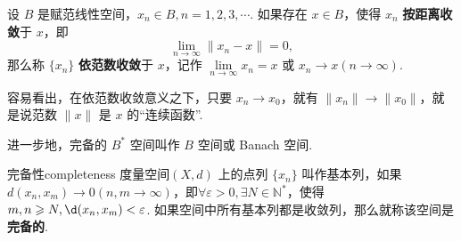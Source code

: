 \documentclass[12pt, a4paper,newtx]{ctexart}
\begin{document}
设 $B$ 是赋范线性空间，$x_n \in B, n = 1, 2, 3, \cdots$. 如果存在 $x \in B$，使得 $x_n$ \textbf{按距离收敛}于 $x$，即
\[
\lim_{n \to \infty} \|x_n - x\| = 0,
\]
那么称 $\{x_n\}$ \textbf{依范数收敛}于 $x$，记作 $\lim\limits_{n \to \infty} x_n = x$ 或 $x_n \to x (n \to \infty)$.

容易看出，在依范数收敛意义之下，只要 $x_n \to x_0$，就有 $\|x_n\| \to \|x_0\|$，就是说范数 $\|x\|$ 是 $x$ 的“连续函数”. 

进一步地，完备的 $B^*$ 空间叫作 $B$ 空间或 Banach 空间. 
\begin{definition}{完备性}{completeness}
	度量空间$(X, d)$ 上的点列 $\{x_n\}$ 叫作基本列，如果$d(x_n, x_m) \rightarrow 0 (n, m \rightarrow \infty)$，即$\forall \varepsilon > 0, \exists N\in\mathbb N^*$，使得 $m, n\geqslant N, \d(x_n, x_m) < \varepsilon$. 如果空间中所有基本列都是收敛列，那么就称该空间是\textbf{完备的}. 
\end{definition}
\end{document}

